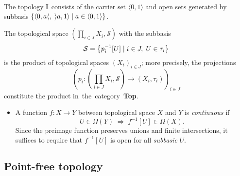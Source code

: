 \begin{exmpl}
  The topology $\mathbb{I}$ consists of the carrier set $\langle 0, 1 \rangle$ and open
  sets generated by subbasis $\{ \langle 0, a \langle, \; \rangle a, 1 \rangle
  \mid a\in \langle 0, 1 \rangle \}$.
\end{exmpl}

\begin{exmpl}
  The topological space $\left( \prod_{i\in J} X_i, \mathcal{S} \right)$ with
  the subbasis
  \[
    \mathcal{S} = \left\{ p_{i}^{-1}[U] \mid i\in J, \; U\in \tau_i \right\}
  \]
  is the product of topological spaces $\left( X_i \right)_{i\in J}$;
  more precisely, the projections
  \[
    \left( p_i\colon \left(\prod_{i\in J} X_i, \mathcal{S}\right) \to
    \left(X_i, \tau_i\right) \right)_{i\in J}
  \]
  constitute the product in~the~category~{\bf Top}.
\end{exmpl}

\begin{itemize}
\item A function $f\colon X \to Y$ between topological space $X$ and $Y$ is
\emph{continuous} if 
\[
  U\in \Omega(Y) \; \Longrightarrow \; f^{-1}[U]\in \Omega(X).
\]
Since the preimage function preserves unions and finite intersections, it
suffices to require that $f^{-1}[U]$ is open for all \emph{subbasic\/} $U$.
\end{itemize}

\subsection*{Point-free topology}

